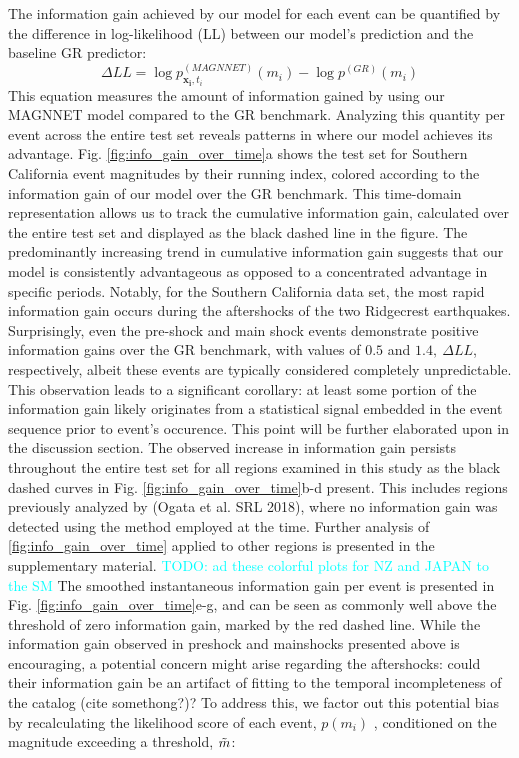 \documentclass[pdflatex]{sn-jnl}
\newcommand{\neri}[1]{{\textcolor{cyan}{#1}}}
\begin{document}
The information gain achieved by our model for each event can be quantified by the difference in log-likelihood (LL) between our model's prediction and the baseline GR predictor:
\begin{equation}
    \Delta LL = \log{p_{\pmb{x_i}, t_i}^{(MAGNNET)}(m_i)} - \log{p^{(GR)}(m_i)}
    \label{eq:information_gain}
\end{equation}
This equation measures the amount of information gained by using our MAGNNET model compared to the GR benchmark. Analyzing this quantity per event across the entire test set reveals patterns in where our model achieves its advantage. Fig. \ref{fig:info_gain_over_time}a shows the test set for Southern California event magnitudes by their running index, colored according to the information gain of our model over the GR benchmark. This time-domain representation allows us to track the cumulative information gain, calculated over the entire test set and displayed as the black dashed line in the figure. The predominantly increasing trend in cumulative information gain suggests that our model is consistently advantageous as opposed to a concentrated advantage in specific periods. Notably, for the Southern California data set, the most rapid information gain occurs during the aftershocks of the two Ridgecrest earthquakes. Surprisingly, even the pre-shock and main shock events demonstrate positive information gains over the GR benchmark, with values of $0.5$ and $1.4, \ \Delta LL$, respectively, albeit these events are typically considered completely unpredictable. This observation leads to a significant corollary: at least some portion of the information gain likely originates from a statistical signal embedded in the event sequence prior to event's occurence. This point will be further elaborated upon in the discussion section.
\newline
The observed increase in information gain persists throughout the entire test set for all regions examined in this study as the black dashed curves in Fig. \ref{fig:info_gain_over_time}b-d present. This includes regions previously analyzed by (Ogata et al. SRL 2018), where no information gain was detected using the method employed at the time. Further analysis of \ref{fig:info_gain_over_time} applied to other regions is presented in the supplementary material. \neri{TODO: ad these colorful plots for NZ and JAPAN to the SM}
The smoothed instantaneous information gain per event is presented in Fig. \ref{fig:info_gain_over_time}e-g, and can be seen as commonly well above the threshold of zero information gain, marked by the red dashed line.
\newline
While the information gain observed in preshock and mainshocks presented above is encouraging, a potential concern might arise regarding the aftershocks: could their information gain be an artifact of fitting to the temporal incompleteness of the catalog (cite somethong?)? To address this, we factor out this potential bias by recalculating the likelihood score of each event, $p(m_i)$ , conditioned on the magnitude exceeding a threshold, $\Tilde{m}$:
\end{document}
